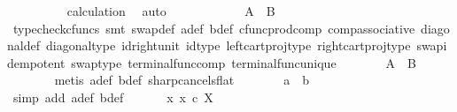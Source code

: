 \begin{isabellebody}
\ \ \ \ \ \ \ \ \isamarkupfalse%
\ calculation\ \isamarkupfalse%
\ auto\isanewline
\ \ \ \ \isamarkupfalse%
\isanewline
\ \ \ \ \isamarkupfalse%
\ \isamarkupfalse%
\ {\isachardoublequoteopen}A\isactrlsup {\isasymflat}\ {\isacharequal}{\kern0pt}\ B\isactrlsup {\isasymflat}{\isachardoublequoteclose}\isanewline
\ \ \ \ \ \ \isamarkupfalse%
\ {\isacharparenleft}{\kern0pt}typecheck{\isacharunderscore}{\kern0pt}cfuncs{\isacharcomma}{\kern0pt}\ smt\ swap{\isacharunderscore}{\kern0pt}def\ a{\isacharunderscore}{\kern0pt}def\ b{\isacharunderscore}{\kern0pt}def\ cfunc{\isacharunderscore}{\kern0pt}prod{\isacharunderscore}{\kern0pt}comp\ comp{\isacharunderscore}{\kern0pt}associative{}\ diagonal{\isacharunderscore}{\kern0pt}def\ diagonal{\isacharunderscore}{\kern0pt}type\ id{\isacharunderscore}{\kern0pt}right{\isacharunderscore}{\kern0pt}unit{}\ id{\isacharunderscore}{\kern0pt}type\ left{\isacharunderscore}{\kern0pt}cart{\isacharunderscore}{\kern0pt}proj{\isacharunderscore}{\kern0pt}type\ right{\isacharunderscore}{\kern0pt}cart{\isacharunderscore}{\kern0pt}proj{\isacharunderscore}{\kern0pt}type\ swap{\isacharunderscore}{\kern0pt}idempotent\ swap{\isacharunderscore}{\kern0pt}type\ terminal{\isacharunderscore}{\kern0pt}func{\isacharunderscore}{\kern0pt}comp\ terminal{\isacharunderscore}{\kern0pt}func{\isacharunderscore}{\kern0pt}unique{\isacharparenright}{\kern0pt}\isanewline
\ \ \ \ \isamarkupfalse%
\ \isamarkupfalse%
\ {\isachardoublequoteopen}A\ {\isacharequal}{\kern0pt}\ B{\isachardoublequoteclose}\isanewline
\ \ \ \ \ \ \isamarkupfalse%
\ {\isacharparenleft}{\kern0pt}metis\ a{\isacharunderscore}{\kern0pt}def\ b{\isacharunderscore}{\kern0pt}def\ sharp{\isacharunderscore}{\kern0pt}cancels{\isacharunderscore}{\kern0pt}flat{\isacharparenright}{\kern0pt}\isanewline
\ \ \ \ \isamarkupfalse%
\ \isamarkupfalse%
\ {\isachardoublequoteopen}a\ {\isacharequal}{\kern0pt}\ b{\isachardoublequoteclose}\isanewline
\ \ \ \ \ \ \isamarkupfalse%
\ {\isacharparenleft}{\kern0pt}simp\ add{\isacharcolon}{\kern0pt}\ a{\isacharunderscore}{\kern0pt}def\ b{\isacharunderscore}{\kern0pt}def{\isacharparenright}{\kern0pt}\isanewline
\ \ \isamarkupfalse%
\isanewline
{}\isamarkupfalse%
\isanewline
\ \ \isamarkupfalse%
\ {\isachardoublequoteopen}{\isasymnexists}x{\isachardot}{\kern0pt}\ x\ {\isasymin}\isactrlsub c\ X{\isachardoublequoteclose}\isanewline

\end{isabellebody}
